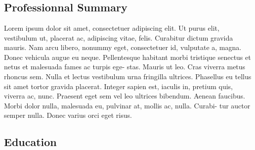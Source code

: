 \documentclass[10pts]{report}
\begin{document}
    \section*{}
	

	\hrulefill
    
    \justifying
    
    \subsection*{Professionnal Summary \hrulefill}
    Lorem ipsum dolor sit amet, consectetuer adipiscing elit. Ut purus elit, vestibulum ut,
    placerat ac, adipiscing vitae, felis. Curabitur dictum gravida mauris. Nam arcu libero,
    nonummy eget, consectetuer id, vulputate a, magna. Donec vehicula augue eu neque.
    Pellentesque habitant morbi tristique senectus et netus et malesuada fames ac turpis ege-
    stas. Mauris ut leo. Cras viverra metus rhoncus sem. Nulla et lectus vestibulum urna
    fringilla ultrices. Phasellus eu tellus sit amet tortor gravida placerat. Integer sapien est,
    iaculis in, pretium quis, viverra ac, nunc. Praesent eget sem vel leo ultrices bibendum.
    Aenean faucibus. Morbi dolor nulla, malesuada eu, pulvinar at, mollis ac, nulla. Curabi-
    tur auctor semper nulla. Donec varius orci eget risus.
    
    \subsection*{Education \hrulefill}
	
\end{document}
